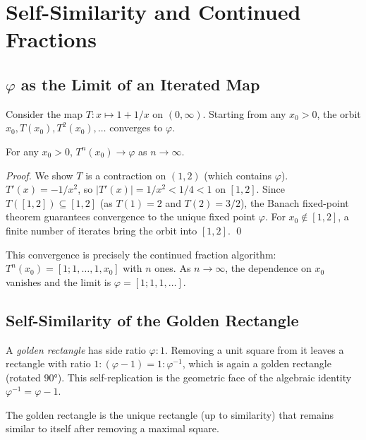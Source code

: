 \section{Self-Similarity and Continued Fractions}
\label{sec:monad-self-similarity}

\subsection{$\varphi$ as the Limit of an Iterated Map}

Consider the map $T: x \mapsto 1 + 1/x$ on $(0,\infty)$.  Starting
from any $x_0 > 0$, the orbit $x_0, T(x_0), T^2(x_0), \ldots$
converges to $\varphi$.

\begin{proposition}\label{prop:T-convergence}
  For any $x_0 > 0$, $T^n(x_0) \to \varphi$ as $n \to \infty$.
\end{proposition}

\begin{proof}
  We show $T$ is a contraction on $(1, 2)$ (which contains $\varphi$).
  $T'(x) = -1/x^2$, so $|T'(x)| = 1/x^2 < 1/4 < 1$ on $[1,2]$.
  Since $T([1,2]) \subseteq [1, 2]$ (as $T(1)=2$ and $T(2)=3/2$),
  the Banach fixed-point theorem guarantees convergence to the unique
  fixed point $\varphi$.  For $x_0 \notin [1,2]$, a finite number of
  iterates bring the orbit into $[1,2]$.  \qed
\end{proof}

\begin{remark}
  This convergence is precisely the continued fraction algorithm:
  $T^n(x_0) = [1; 1, \ldots, 1, x_0]$ with $n$ ones.  As $n \to \infty$,
  the dependence on $x_0$ vanishes and the limit is $\varphi = [1;1,1,\ldots]$.
\end{remark}

\subsection{Self-Similarity of the Golden Rectangle}

A \emph{golden rectangle} has side ratio $\varphi : 1$.  Removing a
unit square from it leaves a rectangle with ratio $1 : (\varphi - 1) = 1 : \varphi^{-1}$,
which is again a golden rectangle (rotated $90°$).  This self-replication
is the geometric face of the algebraic identity $\varphi^{-1} = \varphi - 1$.

\begin{lemma}\label{lem:gnomon}
  The golden rectangle is the unique rectangle (up to similarity) that
  remains similar to itself after removing a maximal square.
\end{lemma}


